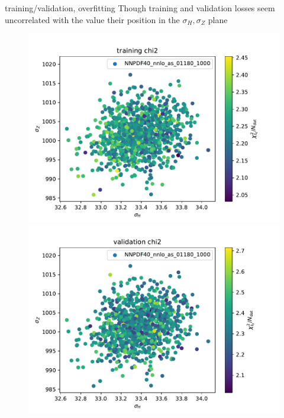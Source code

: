 \documentclass[aspectratio=169,10pt]{beamer}
\begin{document}
\begin{frame}[t]{training/validation, overfitting}
  Though training and validation losses seem uncorrelated with the value their position in the $\sigma_H,\sigma_Z$ plane
  \begin{figure}
    \centering
    \includegraphics[height=.55\textheight]{chi2_training_chi2.pdf}
    \includegraphics[height=.55\textheight]{chi2_validation_chi2.pdf}
  \end{figure}
\end{frame}
\end{document}
